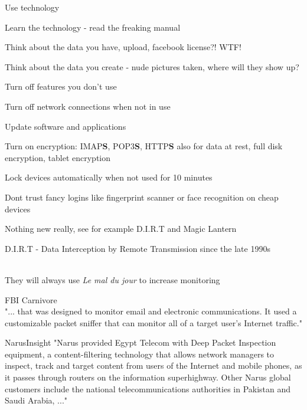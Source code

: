 \documentclass[20pt,landscape,a4paper,footrule]{foils}
\begin{document}
\begin{list1}
\item Use technology
\item Learn the technology - read the freaking manual
\item Think about the data you have, upload, facebook license?! WTF!
\item Think about the data you create - nude pictures taken, where will they show up?
\begin{list2}
\item Turn off features you don't use
\item Turn off network connections when not in use
\item Update software and applications
\item Turn on encryption: IMAP{\bf S}, POP3{\bf S},
  HTTP{\bf S} also for data at rest, full disk encryption, tablet encryption
\item Lock devices automatically when not used for 10 minutes
\item Dont trust fancy logins like fingerprint scanner or face recognition on cheap devices
\end{list2}
\end{list1}




\begin{list1}
\item Nothing new really, see for example D.I.R.T and Magic Lantern
\item D.I.R.T - Data Interception by Remote Transmission since the late 1990s\\
\\

\item They will always use \emph{Le mal du jour} to increase monitoring
\end{list1}


\begin{list1}
\item FBI Carnivore\\
"... that was designed to monitor email and electronic communications. It used a customizable packet sniffer that can monitor all of a target user's Internet traffic."

\item NarusInsight
"Narus provided Egypt Telecom with Deep Packet Inspection equipment, a content-filtering technology that allows network managers to inspect, track and target content from users of the Internet and mobile phones, as it passes through routers on the information superhighway. Other Narus global customers include the national telecommunications authorities in Pakistan and Saudi Arabia, ..."\\

\end{list1}
\end{document}
